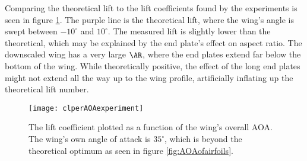   Comparing the theoretical lift to the lift coefficients found by the experiments is seen in figure \ref{fig:clperAOAexperiment}. The purple line is the theoretical lift, where the wing's angle is swept between $-10^\circ$ and $10^\circ$. The measured lift is slightly lower than the theoretical, which may be explained by the end plate's effect on aspect ratio. The downscaled wing has a very large $\AR$, where the end plates extend far below the bottom of the wing. While theoretically positive, the effect of the long end plates might not extend all the way up to the wing profile, artificially inflating up the theoretical lift number.


  \begin{figure}
    \texttt{[image: clperAOAexperiment]}
    \caption{The lift coefficient plotted as a function of the wing's overall AOA. The wing's own angle of attack is $35^\circ$, which is beyond the theoretical optimum as seen in figure \ref{fig:AOAofairfoils}.}
    \label{fig:clperAOAexperiment}
  \end{figure}
